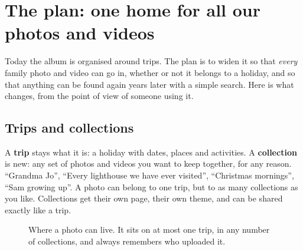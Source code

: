 \documentclass[11pt,a4paper]{article}
\begin{document}
\section{The plan: one home for all our photos and videos}

Today the album is organised around trips. The plan is to widen it so that \emph{every} family photo and video can go in, whether or not it belongs to a holiday, and so that anything can be found again years later with a simple search. Here is what changes, from the point of view of someone using it.

\subsection{Trips and collections}

A \textbf{trip} stays what it is: a holiday with dates, places and activities. A \textbf{collection} is new: any set of photos and videos you want to keep together, for any reason. ``Grandma Jo'', ``Every lighthouse we have ever visited'', ``Christmas mornings'', ``Sam growing up''. A photo can belong to one trip, but to as many collections as you like. Collections get their own page, their own theme, and can be shared exactly like a trip.

\begin{figure}[H]
  \centering
  \caption{Where a photo can live. It sits on at most one trip, in any number of collections, and always remembers who uploaded it.}
\end{figure}
\end{document}
